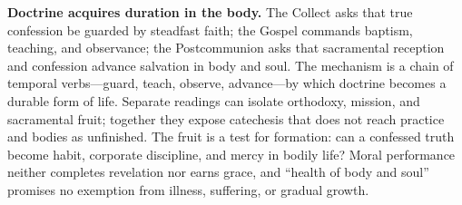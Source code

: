 \noindent\textbf{Doctrine acquires duration in the body.\enspace{}}
The Collect asks that true confession be guarded by steadfast faith; the Gospel commands baptism, teaching, and observance; the Postcommunion asks that sacramental reception and confession advance salvation in body and soul. The mechanism is a chain of temporal verbs---guard, teach, observe, advance---by which doctrine becomes a durable form of life. Separate readings can isolate orthodoxy, mission, and sacramental fruit; together they expose catechesis that does not reach practice and bodies as unfinished. The fruit is a test for formation: can a confessed truth become habit, corporate discipline, and mercy in bodily life? Moral performance neither completes revelation nor earns grace, and ``health of body and soul'' promises no exemption from illness, suffering, or gradual growth.
